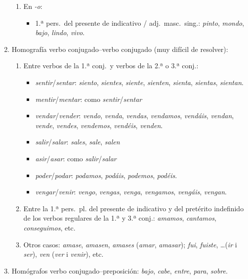 \begin{enumerate}
\begin{enumerate}
\item En \emph{-o}: \begin{itemize} \item 1.ª pers.\ del presente de indicativo / adj.\ masc.\ sing.: \emph{pinto}, \emph{mondo}, \emph{bajo}, \emph{lindo}, \emph{vivo}. \end{itemize} 

\end{enumerate} 

\item Homografía verbo conjugado--verbo conjugado (muy difícil de resolver): \begin{enumerate} \item Entre verbos de la 1.ª conj.\ y verbos de la 2.ª o 3.ª conj.: \begin{itemize} \item \emph{sentir}/\emph{sentar}: \emph{siento}, \emph{sientes}, {\em siente}, \emph{sienten}, \emph{sienta}, \emph{sientas}, \emph{ sientan}. \item \emph{mentir}/\emph{mentar}: como \emph{sentir}/\emph{sentar} \item \emph{vendar}/\emph{vender}: \emph{vendo}, \emph{venda}, {\em vendas}, \emph{vendamos}, \emph{vendáis}, \emph{vendan}, \emph{vende}, \emph{vendes}, \emph{vendemos}, \emph{vendéis}, {\em venden}. \item \emph{salir}/\emph{salar}: \emph{sales}, \emph{sale}, \emph{salen} \item \emph{asir}/\emph{asar}: como \emph{salir}/\emph{salar} \item \emph{poder}/\emph{podar}: \emph{podamos}, \emph{podáis}, {\em podemos}, \emph{podéis}. \item \emph{vengar}/\emph{venir}: \emph{vengo}, \emph{vengas}, {\em venga}, \emph{vengamos}, \emph{vengáis}, \emph{vengan}. \end{itemize} 

\item Entre la 1.ª pers.\ pl. del presente de indicativo y del pretérito indefinido de los verbos regulares de la 1.ª y 3.ª conj.: {\em amamos}, \emph{cantamos}, \emph{conseguimos}, etc. \item Otros casos: \emph{amase}, \emph{amasen}, \emph{amases} ({\em amar}, \emph{amasar}); \emph{fui}, \emph{fuiste}, \ldots (\emph{ir} i \emph{ser}), \emph{ven} (\emph{ver} i \emph{venir}), etc. \end{enumerate} 

\item Homógrafos verbo conjugado--preposición: \emph{bajo}, {\em cabe}, \emph{entre}, \emph{para}, \emph{sobre}. 


\end{enumerate}
